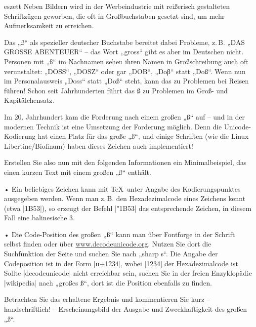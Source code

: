 \documentclass[
	blatt=7,
	ausgabe=28.\,05.\,2010,
	rückgabe=03.\,06.\,2010
]{lcourse-hd}
\begin{document}
\begin{exercise}[
  name={Typographischer Exkurs: \fontspec{Linux Biolinum}\Large ẞ},
  punkte=3,
  abgabe = Quellcode per Mail und Quellcode ausgedruckt. Handschriftlicher Kommentar.]{eszett}
Neben Bildern wird in der Werbeindustrie mit reißerisch gestalteten Schriftzügen geworben, die oft in Großbuchstaben gesetzt sind, um mehr Aufmerksamkeit zu erreichen.

Das „ß“ als spezieller deutscher Buchstabe bereitet dabei Probleme, z.\,B. „DAS GROSSE ABENTEUER“ – das Wort „gross“ gibt es aber im Deutschen nicht. Personen mit „ß“ im Nachnamen sehen ihren Namen in Großschreibung auch oft verunstaltet: „DOSS“, „DOSZ“ oder gar „DOB“, „Doβ“ statt „Doß“. Wenn nun im Personalausweis „Doss“ statt „Doß“ steht, kann das zu Problemen bei Reisen führen! Schon seit Jahrhunderten führt das ß zu Problemen im Groß- und Kapitälchensatz.

Im 20. Jahrhundert kam die Forderung nach einem großen „ß“ auf – und in der modernen Technik ist eine Umsetzung der Forderung möglich. Denn die Unicode-Kodierung hat einen Platz für das große „ß“, und einige Schriften (wie die Linux Libertine/Biolinum) haben dieses Zeichen auch implementiert!

Erstellen Sie also nun mit den folgenden Informationen ein Minimalbeispiel, das einen kurzen Text mit einem großen „ß“ enthält.

• Ein beliebiges Zeichen kann mit \TeX\ unter Angabe des Kodierungspunktes ausgegeben werden. Wenn man z.\,B. den Hexadezimalcode eines Zeichens kennt (etwa |1B53|), so erzeugt der Befehl |\char"1B53| das entsprechende Zeichen, in diesem Fall eine balinesische 3.

• Die Code-Position des großen „ß“ kann man über Fontforge in der Schrift selbst finden oder über \url{www.decodeunicode.org}. Nutzen Sie dort die Suchfunktion der Seite und suchen Sie nach „sharp s“. Die Angabe der Codeposition ist in der Form |u+1234|, wobei |1234| der Hexadezimalcode ist. Sollte |decodeunicode| nicht erreichbar sein, suchen Sie in der freien Enzyklopädie |wikipedia| nach „großes ß“, dort ist die Position ebenfalls zu finden.

Betrachten Sie das erhaltene Ergebnis und kommentieren Sie kurz – handschriftlich! – Erscheinungsbild der Ausgabe und Zweckhaftigkeit des großen „ß“.
\end{exercise}
\end{document}
